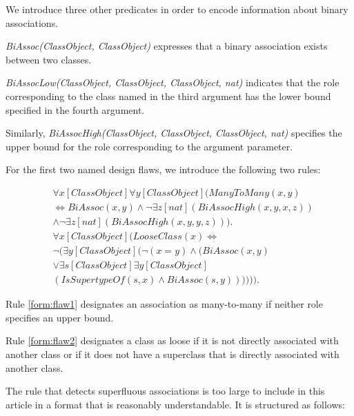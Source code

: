 \documentclass[conference]{IEEEtran}
\begin{document}
We introduce three other predicates in order to encode information about binary associations.

\textit{BiAssoc(ClassObject, ClassObject)} expresses that a binary association exists between two classes.

\textit{BiAssocLow(ClassObject, ClassObject, ClassObject, nat)} indicates that the role corresponding to the class named in the third argument has the lower bound specified in the fourth argument.

Similarly, \textit{BiAssocHigh(ClassObject, ClassObject, ClassObject, nat)} specifies the upper bound for the role corresponding to the argument parameter.

For the first two named design flaws, we introduce the following two rules:

\begin{align}
	\nonumber &\forall{x}[ClassObject]\forall{y}[ClassObject](ManyToMany(x, y) \\ \nonumber &\Leftrightarrow BiAssoc(x, y) \land \lnot \exists{z}[nat](BiAssocHigh(x, y, x, z)) \\ &\land \lnot \exists{z}[nat](BiAssocHigh(x, y, y, z))).\label{form:flaw1} \\
	\nonumber &\forall{x}[ClassObject](LooseClass(x) \Leftrightarrow \\ \nonumber &\lnot (\exists{y}[ClassObject](\lnot(x = y) \land (BiAssoc(x, y) \\ \nonumber  &\lor \exists{s}[ClassObject]\exists{y}[ClassObject]\\ &(IsSupertypeOf(s, x) \land BiAssoc(s, y)))))).\label{form:flaw2}
\end{align}

Rule \ref{form:flaw1} designates an association as many-to-many if neither role specifies an upper bound.

Rule \ref{form:flaw2} designates a class as loose if it is not directly associated with another class or if it does not have a superclass that is directly associated with another class.

The rule that detects superfluous associations is too large to include in this article in a format that is reasonably understandable. It is structured as follows:
\end{document}

